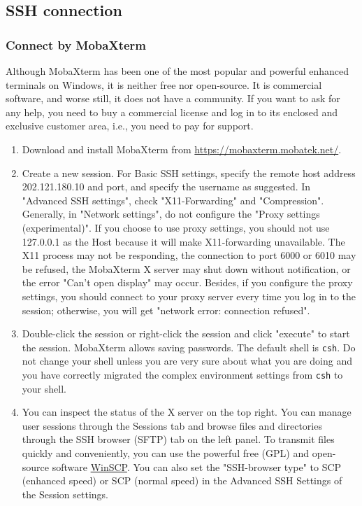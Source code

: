 \documentclass[a4paper,12pt,twoside]{article}
\begin{document}
\subsection{SSH connection}
\subsubsection{Connect by MobaXterm}
Although MobaXterm has been one of the most popular and powerful enhanced terminals on Windows, it is neither free nor open-source. It is commercial software, and worse still, it does not have a community. If you want to ask for any help, you need to buy a commercial license and log in to its enclosed and exclusive customer area, i.e., you need to pay for support.%
\begin{enumerate}
    \item Download and install MobaXterm from \url{https://mobaxterm.mobatek.net/}.
    \item Create a new session. For Basic SSH settings, specify the remote host address 202.121.180.10 and port, and specify the username as suggested. In "Advanced SSH settings", check "X11-Forwarding" and "Compression". Generally, in "Network settings", do not configure the "Proxy settings (experimental)". If you choose to use proxy settings, you should not use 127.0.0.1 as the Host because it will make X11-forwarding unavailable. The X11 process may not be responding, the connection to port 6000 or 6010 may be refused, the MobaXterm X server may shut down without notification, or the error "Can't open display" may occur. Besides, if you configure the proxy settings, you should connect to your proxy server every time you log in to the session; otherwise, you will get "network error: connection refused".
    \item Double-click the session or right-click the session and click "execute" to start the session. MobaXterm allows saving passwords. The default shell is \texttt{csh}. Do not change your shell unless you are very sure about what you are doing and you have correctly migrated the complex environment settings from \texttt{csh} to your shell.
    \item You can inspect the status of the X server on the top right. You can manage user sessions through the Sessions tab and browse files and directories through the SSH browser (SFTP) tab on the left panel. To transmit files quickly and conveniently, you can use the powerful free (GPL) and open-source software \href{https://winscp.net/eng/download.php}{WinSCP}. You can also set the "SSH-browser type" to SCP (enhanced speed) or SCP (normal speed) in the Advanced SSH Settings of the Session settings.

\end{enumerate}
\end{document}
